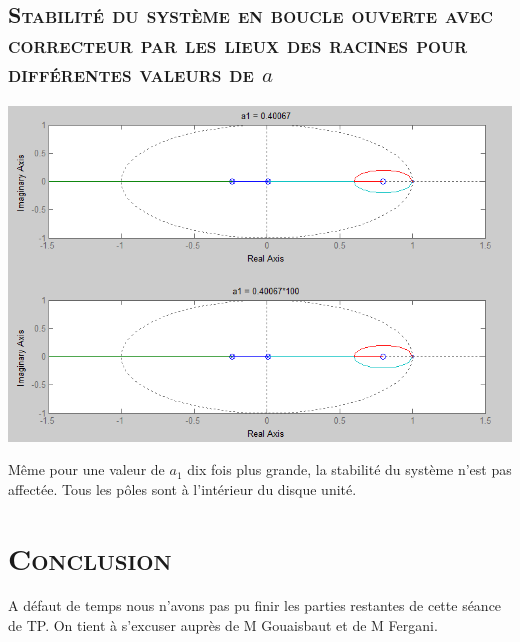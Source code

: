  \section{\textsc{Stabilité du système en boucle ouverte avec correcteur par les lieux des racines pour différentes valeurs de $a$}}
 
 		\begin{center}
	\includegraphics[scale=0.5]{rl3.png}
	\label{fig17} 
	\end{center}
		
	\par Même pour une valeur de $a_1$ dix fois plus grande, la stabilité du système n'est pas affectée. Tous les pôles sont à l'intérieur du disque unité.
  	
\chapter*{\textsc{Conclusion}}
  
  \par A défaut de temps nous n'avons pas pu finir les parties restantes de cette séance de TP. On tient à s'excuser auprès de M Gouaisbaut et de M Fergani.